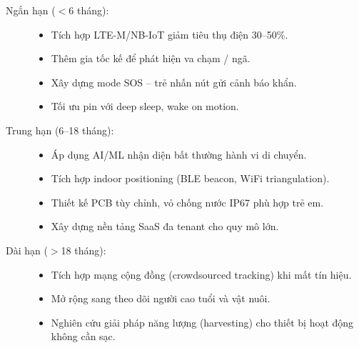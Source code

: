 \begin{description}
  \item[Ngắn hạn ($<$6 tháng):]
    \begin{itemize}[noitemsep]
      \item Tích hợp LTE-M/NB-IoT giảm tiêu thụ điện 30--50\%.
      \item Thêm gia tốc kế để phát hiện va chạm / ngã.
      \item Xây dựng mode SOS -- trẻ nhấn nút gửi cảnh báo khẩn.
      \item Tối ưu pin với deep sleep, wake on motion.
    \end{itemize}

  \item[Trung hạn (6--18 tháng):]
    \begin{itemize}[noitemsep]
      \item Áp dụng AI/ML nhận diện bất thường hành vi di chuyển.
      \item Tích hợp indoor positioning (BLE beacon, WiFi triangulation).
      \item Thiết kế PCB tùy chỉnh, vỏ chống nước IP67 phù hợp trẻ em.
      \item Xây dựng nền tảng SaaS đa tenant cho quy mô lớn.
    \end{itemize}

  \item[Dài hạn ($>$18 tháng):]
    \begin{itemize}[noitemsep]
      \item Tích hợp mạng cộng đồng (crowdsourced tracking) khi mất tín hiệu.
      \item Mở rộng sang theo dõi người cao tuổi và vật nuôi.
      \item Nghiên cứu giải pháp năng lượng (harvesting) cho thiết bị hoạt động không cần sạc.
    \end{itemize}
\end{description}
